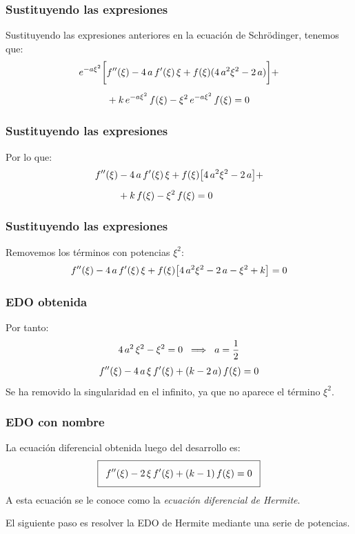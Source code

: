 \documentclass[12pt]{beamer}
\begin{document}
\begin{frame}
\frametitle{Sustituyendo las expresiones}
Sustituyendo las expresiones anteriores en la ecuación de Schrödinger, tenemos que:
\pause
\begin{align*}
e^{-a \xi^{2}} \bigg[ &{f}^{\prime \prime}(\xi) - 4 \, a \, {f}^{\prime}(\xi) \, \xi + f(\xi) (4 \, a^{2} \xi^{2} - 2 \, a) \bigg] + \\[0.5em]
&+ k \, e^{-a \xi^{2}} \, f(\xi) - \xi^{2} \, e^{-a \xi^{2}} \, f(\xi) = 0
\end{align*}
\end{frame}
\begin{frame}
\frametitle{Sustituyendo las expresiones}
Por lo que:
\pause
\begin{align*}
{f}^{\prime \prime}(\xi) &- 4 \, a \, {f}^{\prime}(\xi) \, \xi + f(\xi) \big[ 4 \, a^{2} \xi^{2} - 2 \, a \big] + \\[0.5em]
&+ k \, f(\xi) - \xi^{2} \, f(\xi) = 0
\end{align*}
\end{frame}
\begin{frame}
\frametitle{Sustituyendo las expresiones}
Removemos los términos con potencias $\xi^{2}$:
\pause
\begin{align*}
{f}^{\prime \prime}(\xi) - 4 \, a \, {f}^{\prime}(\xi) \, \xi + f(\xi) \big[ 4 \, a^{2} \xi^{2} - 2 \, a - \xi^{2} +  k \big] = 0
\end{align*}
\end{frame}
\begin{frame}
\frametitle{EDO obtenida}
Por tanto:
\pause
\begin{align*}
4 \, a^{2} \, \xi^{2} - \xi^{2} = 0 \hspace{0.2cm} \Longrightarrow \hspace{0.2cm} a = \dfrac{1}{2}
\end{align*}
\pause
\begin{align*}
{f}^{\prime \prime}(\xi) - 4 \, a \, \xi \, {f}^{\prime}(\xi) + (k - 2 \, a) \, f(\xi) = 0
\end{align*}    
Se ha removido la singularidad en el infinito, ya que no aparece el término $\xi^{2}$.
\end{frame}
\begin{frame}
\frametitle{EDO con nombre}
La ecuación diferencial obtenida luego del desarrollo es:
\pause
\begin{align*}
\addtolength{\fboxsep}{5pt}\boxed{
\sderivada{f} (\xi) - 2 \, \xi \, \pderivada{f}(\xi) + (k - 1) \, f(\xi) = 0}
\end{align*}
A esta ecuación se le conoce como la \emph{ecuación diferencial de Hermite}.
\pause
\\
\par
El siguiente paso es resolver la EDO de Hermite mediante una serie de potencias.
\end{frame}
\end{document}

